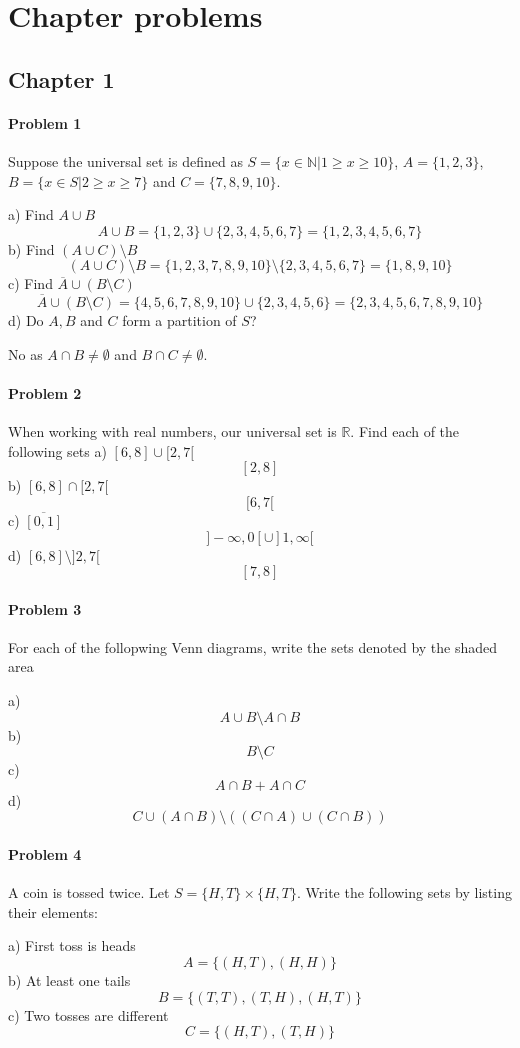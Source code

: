 \section{Chapter problems}
\subsection{Chapter 1}
\paragraph{Problem 1}
Suppose the universal set is defined as $S=\{x\in \mathbb{N} | 1\geq x \geq 10\}$, $A=\{1,2,3\}$, $B=\{x\in S|2\geq x\geq 7\}$ and $C=\{7,8,9,10\}$.

a) Find $A\cup B$
\[
    A\cup B=\{1,2,3\}\cup\{2,3,4,5,6,7\}=\{1,2,3,4,5,6,7\}
\]
b) Find $(A\cup C)\setminus B$
\[
    (A\cup C)\setminus B=\{1,2,3,7,8,9,10\}\setminus \{2,3,4,5,6,7\}=\{1,8,9,10\}
\]
c) Find $\overline{A}\cup(B\setminus C)$
\[
    \overline{A}\cup(B\setminus C)=\{4,5,6,7,8,9,10\}\cup\{2,3,4,5,6\}=\{2,3,4,5,6,7,8,9,10\}
\]
d) Do $A,B$ and $C$ form a partition of $S$?

No as $A\cap B\neq\emptyset$ and $B\cap C\neq\emptyset$.
\paragraph{Problem 2}
When working with real numbers, our universal set is $\mathbb{R}$. Find each of the following sets
a) $[6,8]\cup[2,7[$
\[
    [2,8]
\]
b) $[6,8]\cap[2,7[$
\[
    [6,7[
\]
c) $\overline{[0,1]}$
\[
    ]-\infty,0[\cup]1,\infty[
\]
d) $[6,8]\setminus ]2,7[$
\[
    [7,8]
\]
\paragraph{Problem 3}
For each of the follopwing Venn diagrams, write the sets denoted by the shaded area

a)
\[
    A\cup B\setminus A\cap B
\]
b)
\[
    B\setminus C
\]
c)
\[
    A\cap B+A\cap C
\]
d)
\[
    C\cup(A\cap B)\setminus ((C\cap A)\cup (C\cap B))
\]
\paragraph{Problem 4}
A coin is tossed twice. Let $S=\{H,T\}\times\{H,T\}$. Write the following sets by listing their elements:

a) First toss is heads
\[
    A=\{(H,T),(H,H)\}
\]
b) At least one tails
\[
    B=\{(T,T),(T,H),(H,T)\}
\]
c) Two tosses are different
\[
    C=\{(H,T),(T,H)\}
\]
